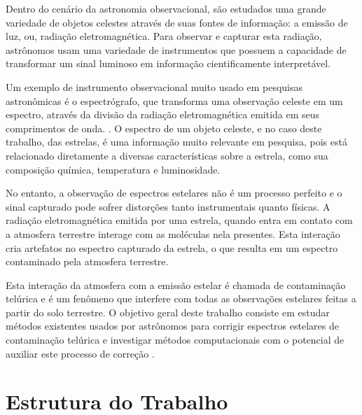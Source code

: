 Dentro do cenário da astronomia observacional, são estudados uma grande variedade de objetos celestes através de suas fontes de informação: a emissão de luz, ou, radiação eletromagnética. Para observar e capturar esta radiação, astrônomos usam uma variedade de instrumentos que possuem a capacidade de transformar um sinal luminoso em informação cientificamente interpretável.

Um exemplo de instrumento observacional muito usado em pesquisas astronômicas é o espectrógrafo, que transforma uma observação celeste em um espectro, através da divisão da radiação eletromagnética emitida em seus comprimentos de onda. . O espectro de um objeto celeste, e no caso deste trabalho, das estrelas, é uma informação muito relevante em pesquisa, pois está relacionado diretamente a diversas características sobre a estrela, como sua composição química, temperatura e luminosidade.

No entanto, a observação de espectros estelares não é um processo perfeito e o sinal capturado pode sofrer distorções tanto instrumentais quanto físicas. A radiação eletromagnética emitida por uma estrela, quando entra em contato com a atmosfera terrestre interage com as moléculas nela presentes. Esta interação cria artefatos no espectro capturado da estrela, %
o que resulta em um espectro contaminado pela atmosfera terrestre. 

Esta interação da atmosfera com a emissão estelar é chamada de contaminação telúrica e é um fenômeno que interfere com todas as observações estelares feitas a partir do solo terrestre. O objetivo geral deste trabalho consiste em estudar métodos existentes usados por astrônomos para corrigir espectros estelares de contaminação telúrica e investigar métodos computacionais com o potencial de auxiliar este processo de correção .


\section{Estrutura do Trabalho}

